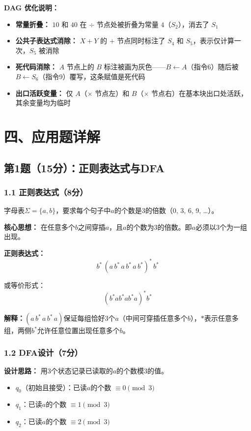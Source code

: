 \documentclass[12pt,a4paper,fontset=fandol]{ctexart}
\begin{document}
\textbf{DAG 优化说明：}
\begin{itemize}
    \item \textbf{常量折叠：} $10$ 和 $40$ 在 $\div$ 节点处被折叠为常量 $4$（$S_2$），消去了 $S_1$
    \item \textbf{公共子表达式消除：} $X+Y$ 的 $+$ 节点同时标注了 $S_4$ 和 $S_5$，表示仅计算一次，$S_5$ 被消除
    \item \textbf{死代码消除：} $A$ 节点上的 $B$ 标注被画为灰色——$B{\gets}A$（指令6）随后被 $B{\gets}S_6$（指令9）覆写，这条赋值是死代码
    \item \textbf{出口活跃变量：} 仅 $A$（$\times$ 节点左）和 $B$（$\times$ 节点右）在基本块出口处活跃，其余变量均为临时
\end{itemize}


\section{四、应用题详解}

\subsection{第1题（15分）：正则表达式与DFA}

\subsubsection*{1.1 正则表达式（8分）}
字母表$\Sigma = \{a, b\}$，要求每个句子中$a$的个数是3的倍数（0, 3, 6, 9, \dots）。

\textbf{核心思想：} 在任意多个$b$之间穿插$a$，且$a$的个数为3的倍数。即$a$必须以3个为一组出现。

\textbf{正则表达式：}
\[
\boxed{b^*\,(a\,b^*\,a\,b^*\,a\,b^*)^*\,b^*}
\]

或等价形式：
\[
\boxed{(b^*ab^*ab^*a)^*b^*}
\]

\textbf{解释：}$(a\,b^*\,a\,b^*\,a)$保证每组恰好3个$a$（中间可穿插任意多个$b$），$*$表示任意多组，两侧$b^*$允许任意位置出现任意多个$b$。

\subsubsection*{1.2 DFA设计（7分）}

\textbf{设计思路：} 用3个状态记录已读取的$a$的个数模3的值。
\begin{itemize}
    \item $q_0$（初始且接受）：已读$a$的个数 $\equiv 0 \pmod 3$
    \item $q_1$：已读$a$的个数 $\equiv 1 \pmod 3$
    \item $q_2$：已读$a$的个数 $\equiv 2 \pmod 3$
\end{itemize}
\end{document}
